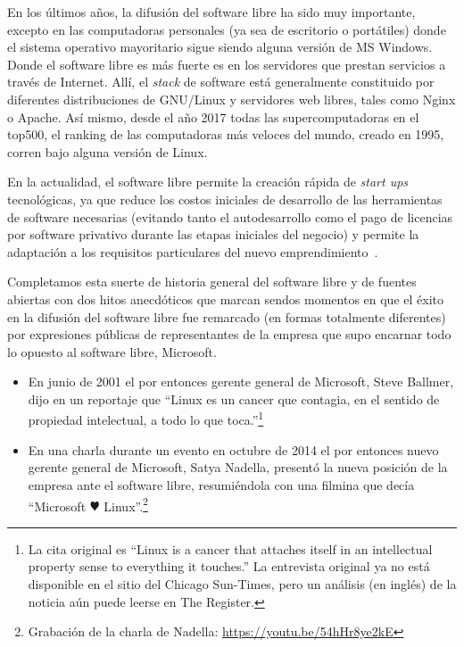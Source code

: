En los últimos años, la difusión del software libre ha sido muy importante, excepto en las computadoras personales (ya sea de escritorio o portátiles) donde el sistema operativo mayoritario sigue siendo alguna versión de MS Windows. Donde el software libre es más fuerte es en los servidores que prestan servicios a través de Internet. Allí, el \textit{stack} de software está generalmente constituido por diferentes distribuciones de GNU/Linux y servidores web libres, tales como Nginx o Apache. Así mismo, desde el año 2017 todas las supercomputadoras en el top500, el ranking de las computadoras más veloces del mundo, creado en 1995, corren bajo alguna versión de Linux.

En la actualidad, el software libre permite la creación rápida de \textit{start ups} tecnológicas, ya que reduce los costos iniciales de desarrollo de las herramientas de software necesarias (evitando tanto el autodesarrollo como el pago de licencias por software privativo durante las etapas iniciales del negocio) y permite la adaptación a los requisitos particulares del nuevo emprendimiento~\cite{kamau16, singh21, gerasimenko16, wiggers21}. 

Completamos esta suerte de historia general del software libre y de fuentes abiertas con dos hitos anecdóticos que marcan sendos momentos en que el éxito en la difusión del software libre fue remarcado (en formas totalmente diferentes) por expresiones públicas de representantes de la empresa que supo encarnar todo lo opuesto al software libre, Microsoft. 

\begin{itemize}
\item En junio de 2001 el por entonces gerente general de Microsoft, Steve Ballmer, dijo en un reportaje que ``Linux es un cancer que contagia, en el sentido de propiedad intelectual, a todo lo que toca.''\footnote{La cita original es ``Linux is a cancer that attaches itself in an intellectual property sense to everything it touches.'' La entrevista original ya no está disponible en el sitio del Chicago Sun-Times, pero un análisis (en inglés) de la noticia aún puede leerse en The Register\cite{theregister01}.}

\item En una charla durante un evento en octubre de 2014 el por entonces nuevo gerente general de Microsoft, Satya Nadella, presentó la nueva posición de la empresa ante el software libre, resumiéndola con una filmina que decía ``Microsoft $\varheartsuit$ Linux''.\footnote{Grabación de la charla de Nadella: \url{https://youtu.be/54hHr8ye2kE}}

\end{itemize}


